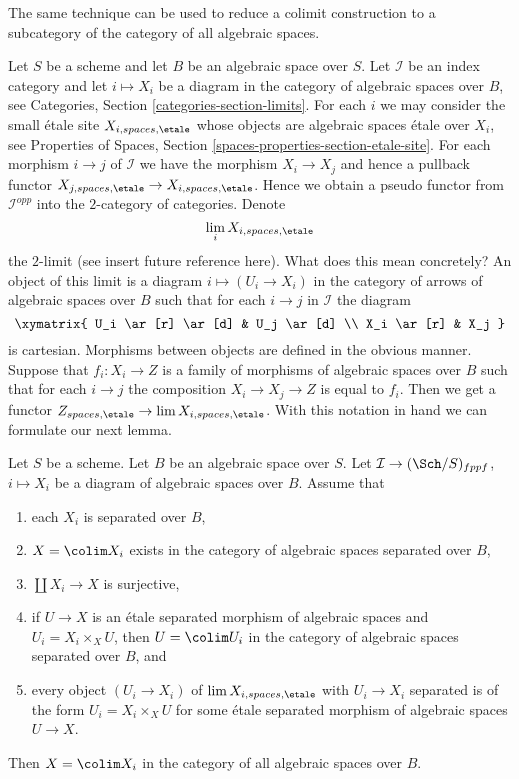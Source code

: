 \noindent
The same technique can be used to reduce a colimit construction to a
subcategory of the category of all algebraic spaces.

\medskip\noindent
Let $S$ be a scheme and let $B$ be an algebraic space over $S$. Let
$\mathcal{I}$ be an index category and let $i \mapsto X_i$
be a diagram in the category of algebraic spaces over $B$,
see Categories, Section \ref{categories-section-limits}.
For each $i$ we may consider the small \'etale site
$X_{i, spaces, \etale}$
whose objects are algebraic spaces \'etale over $X_i$, see
Properties of Spaces, Section \ref{spaces-properties-section-etale-site}.
For each morphism $i \to j$ of $\mathcal{I}$ we have the morphism
$X_i \to X_j$ and hence a pullback functor
$X_{j, spaces, \etale} \to X_{i, spaces, \etale}$.
Hence we obtain a pseudo functor from $\mathcal{I}^{opp}$ into
the $2$-category of categories. Denote
$$
\lim_i X_{i, spaces, \etale}
$$
the $2$-limit (see insert future reference here). What does this mean
concretely? An object of this limit is a diagram
$i \mapsto (U_i \to X_i)$ in the category of arrows of
algebraic spaces over $B$
such that for each $i \to j$ in $\mathcal{I}$ the diagram
$$
\xymatrix{
U_i \ar[r] \ar[d] & U_j \ar[d] \\
X_i \ar[r] & X_j
}
$$
is cartesian. Morphisms between objects are defined in the obvious manner.
Suppose that $f_i : X_i \to Z$ is a family of morphisms of algebraic
spaces over $B$ such that
for each $i \to j$ the composition $X_i \to X_j \to Z$ is equal to $f_i$.
Then we get a functor $Z_{spaces, \etale} \to \lim X_{i, spaces, \etale}$.
With this notation in hand we can formulate our next lemma.

\begin{lemma}
\label{lemma-colimit-separated-enough}
Let $S$ be a scheme. Let $B$ be an algebraic space over $S$.
Let $\mathcal{I} \to (\Sch/S)_{fppf}$, $i \mapsto X_i$
be a diagram of algebraic spaces over $B$. Assume that
\begin{enumerate}
\item each $X_i$ is separated over $B$,
\item $X = \colim X_i$ exists in the category of
algebraic spaces separated over $B$,
\item $\coprod X_i \to X$ is surjective,
\item if $U \to X$ is an \'etale separated morphism of algebraic spaces and
$U_i = X_i \times_X U$, then $U = \colim U_i$ in
the category of algebraic spaces separated over $B$, and
\item every object $(U_i \to X_i)$ of $\lim X_{i, spaces, \etale}$
with $U_i \to X_i$ separated is of the form $U_i = X_i \times_X U$
for some \'etale separated morphism of algebraic spaces $U \to X$.
\end{enumerate}
Then $X = \colim X_i$ in the category of all algebraic spaces over $B$.
\end{lemma}

